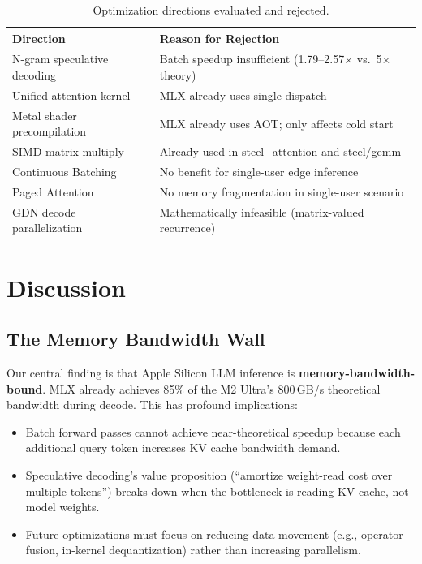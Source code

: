 \documentclass[11pt,a4paper]{article}
\begin{document}
\begin{table}[H]
\centering
\caption{Optimization directions evaluated and rejected.}
\label{tab:not_recommended}
\begin{tabularx}{\textwidth}{lX}
\toprule
\textbf{Direction} & \textbf{Reason for Rejection} \\
\midrule
N-gram speculative decoding & Batch speedup insufficient (1.79--2.57$\times$ vs.\ 5$\times$ theory) \\
Unified attention kernel & MLX already uses single dispatch \\
Metal shader precompilation & MLX already uses AOT; only affects cold start \\
SIMD matrix multiply & Already used in steel\_attention and steel/gemm \\
Continuous Batching & No benefit for single-user edge inference \\
Paged Attention & No memory fragmentation in single-user scenario \\
GDN decode parallelization & Mathematically infeasible (matrix-valued recurrence) \\
\bottomrule
\end{tabularx}
\end{table}

\section{Discussion}

\subsection{The Memory Bandwidth Wall}

Our central finding is that Apple Silicon LLM inference is \textbf{memory-bandwidth-bound}. MLX already achieves 85\% of the M2 Ultra's 800\,GB/s theoretical bandwidth during decode. This has profound implications:

\begin{itemize}[leftmargin=2em]
  \item Batch forward passes cannot achieve near-theoretical speedup because each additional query token increases KV cache bandwidth demand.
  \item Speculative decoding's value proposition (``amortize weight-read cost over multiple tokens'') breaks down when the bottleneck is reading KV cache, not model weights.
  \item Future optimizations must focus on reducing data movement (e.g., operator fusion, in-kernel dequantization) rather than increasing parallelism.
\end{itemize}
\end{document}
